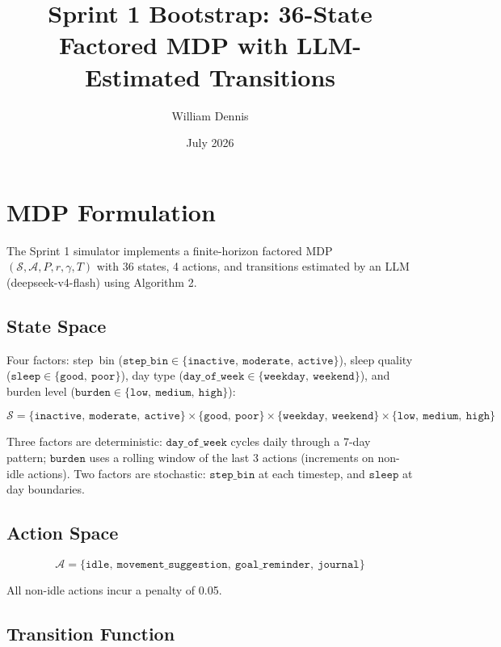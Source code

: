 \documentclass[11pt]{article}
\title{Sprint 1 Bootstrap: 36-State Factored MDP with LLM-Estimated Transitions}
\author{William Dennis}
\date{July 2026}
\begin{document}
\maketitle

\section{MDP Formulation}

The Sprint 1 simulator implements a finite-horizon factored MDP $(\mathcal{S}, \mathcal{A}, P, r, \gamma, T)$ with 36 states, 4 actions, and transitions estimated by an LLM (deepseek-v4-flash) using Algorithm 2.

\subsection{State Space}

Four factors: step~bin ($\texttt{step\_bin} \in \{\texttt{inactive},\ \texttt{moderate},\ \texttt{active}\}$), sleep quality ($\texttt{sleep} \in \{\texttt{good},\ \texttt{poor}\}$), day type ($\texttt{day\_of\_week} \in \{\texttt{weekday},\ \texttt{weekend}\}$), and burden level ($\texttt{burden} \in \{\texttt{low},\ \texttt{medium},\ \texttt{high}\}$):

\[
\mathcal{S} = \{\texttt{inactive},\ \texttt{moderate},\ \texttt{active}\}
\times \{\texttt{good},\ \texttt{poor}\}
\times \{\texttt{weekday},\ \texttt{weekend}\}
\times \{\texttt{low},\ \texttt{medium},\ \texttt{high}\}
\]

Three factors are deterministic: $\texttt{day\_of\_week}$ cycles daily through a 7-day pattern; $\texttt{burden}$ uses a rolling window of the last 3 actions (increments on non-idle actions). Two factors are stochastic: $\texttt{step\_bin}$ at each timestep, and $\texttt{sleep}$ at day boundaries.

\subsection{Action Space}

\[
\mathcal{A} = \{\texttt{idle},\ \texttt{movement\_suggestion},\ \texttt{goal\_reminder},\ \texttt{journal}\}
\]

All non-idle actions incur a penalty of 0.05.

\subsection{Transition Function}
\end{document}
